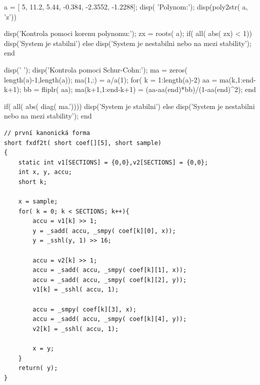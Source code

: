 \begin{matlab}[frame=single,float=htbp,caption={Příklad Schur-Cohnova testu stability v~prostředí Matlab.},label=lst:priklad.vypis.kodu.Matlab,numberstyle=\scriptsize, numbersep=7pt]

a = [ 5, 11.2, 5.44, -0.384, -2.3552, -1.2288];
disp( 'Polynom:'); disp(poly2str( a, 'z'))

disp('Kontrola pomoci korenu polynomu:');
zx = roots( a);
if( all( abs( zx) < 1))
    disp('System je stabilni')
else
    disp('System je nestabilni nebo na mezi stability');
end

disp(' '); disp('Kontrola pomoci Schur-Cohn:');
ma = zeros( length(a)-1,length(a));
ma(1,:) = a/a(1);
for( k = 1:length(a)-2)
    aa = ma(k,1:end-k+1);
    bb = fliplr( aa);
    ma(k+1,1:end-k+1) = (aa-aa(end)*bb)/(1-aa(end)^2);
end

if( all( abs( diag( ma.'))))
    disp('System je stabilni')
else
    disp('System je nestabilni nebo na mezi stability');
end
\end{matlab}

\noindent
\begin{minipage}{\linewidth}



\begin{lstlisting}[frame=single,numbers=right,caption={Příklad implementace první kanonické formy v~jazyce C.},label=lst:priklad.vypis.kodu.C,basicstyle=\ttfamily\small, keywordstyle=\color{black}\bfseries\underbar,]
// první kanonická forma
short fxdf2t( short coef[][5], short sample)
{
	static int v1[SECTIONS] = {0,0},v2[SECTIONS] = {0,0};
	int x, y, accu;
	short k;

	x = sample;
	for( k = 0; k < SECTIONS; k++){
		accu = v1[k] >> 1;
		y = _sadd( accu, _smpy( coef[k][0], x));
		y = _sshl(y, 1) >> 16;

		accu = v2[k] >> 1;
		accu = _sadd( accu, _smpy( coef[k][1], x));
		accu = _sadd( accu, _smpy( coef[k][2], y));
		v1[k] = _sshl( accu, 1);

		accu = _smpy( coef[k][3], x);
		accu = _sadd( accu, _smpy( coef[k][4], y));
		v2[k] = _sshl( accu, 1);

		x = y;
	}
	return( y);
}
\end{lstlisting}
\end{minipage}







